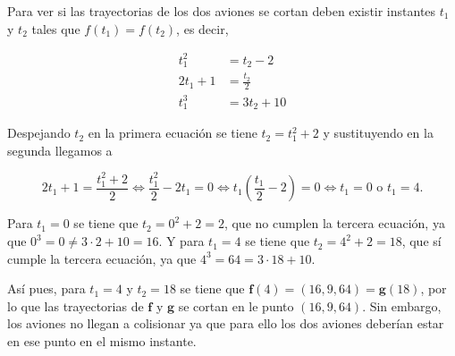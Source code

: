 \documentclass[
  spanish,
  a4paper,
]{scrreport}
\theoremstyle{definition}
\theoremstyle{remark}
\begin{document}
\begin{tcolorbox}[enhanced jigsaw, arc=.35mm, bottomrule=.15mm, bottomtitle=1mm, breakable, colback=white, colbacktitle=quarto-callout-tip-color!10!white, colframe=quarto-callout-tip-color-frame, coltitle=black, left=2mm, leftrule=.75mm, opacityback=0, opacitybacktitle=0.6, rightrule=.15mm, title=\textcolor{quarto-callout-tip-color}{\faLightbulb}\hspace{0.5em}{Solución}, titlerule=0mm, toprule=.15mm, toptitle=1mm]

Para ver si las trayectorias de los dos aviones se cortan deben existir
instantes \(t_1\) y \(t_2\) tales que \(f(t_1)=f(t_2)\), es decir,

\begin{align*}
t_1^2 &= t_2-2\\
2t_1+1 &= \frac{t_2}{2}\\
t_1^3 &= 3t_2+10
\end{align*}

Despejando \(t_2\) en la primera ecuación se tiene \(t_2 = t_1^2+2\) y
sustituyendo en la segunda llegamos a

\[
2t_1 + 1 = \frac{t_1^2+2}{2} \Leftrightarrow \frac{t_1^2}{2}-2t_1 = 0 \Leftrightarrow t_1\left(\frac{t_1}{2}-2\right)=0 \Leftrightarrow t_1 = 0 \mbox{ o } t_1 = 4.
\]

Para \(t_1=0\) se tiene que \(t_2 = 0^2+2 = 2\), que no cumplen la
tercera ecuación, ya que \(0^3=0\neq 3\cdot 2 +10 =16\). Y para
\(t_1=4\) se tiene que \(t_2=4^2+2=18\), que sí cumple la tercera
ecuación, ya que \(4^3 = 64 = 3\cdot 18 + 10\).

Así pues, para \(t_1=4\) y \(t_2=18\) se tiene que
\(\mathbf{f}(4) = (16, 9, 64) = \mathbf{g}(18)\), por lo que las
trayectorias de \(\mathbf{f}\) y \(\mathbf{g}\) se cortan en le punto
\((16, 9, 64)\). Sin embargo, los aviones no llegan a colisionar ya que
para ello los dos aviones deberían estar en ese punto en el mismo
instante.

\end{tcolorbox}
\end{document}
